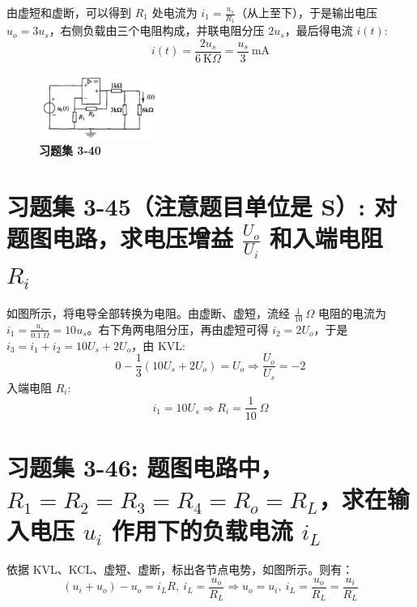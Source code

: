 \documentclass[UTF8]{report}
\def\mA{\ \mathrm{mA}}
\def\KO{\ \mathrm{K}\Omega}
\theoremstyle{MyLineTheoremStyle} %
\theoremstyle{MyBlockTheoremStyle} %
\theoremstyle{MySubsubsectionStyle} %
\begin{document}
由虚短和虚断，可以得到 $R_1$ 处电流为 $i_1 = \frac{u_s}{R_1}$（从上至下），于是输出电压 $u_o = 3u_s$，右侧负载由三个电阻构成，并联电阻分压 $2u_s$，最后得电流 $i(t)$:
\begin{equation}
i(t) = \frac{2u_s}{6 \KO} = \frac{u_s}{3} \mA
\end{equation}

\begin{figure}[H]\centering
\includegraphics[width=0.35\textwidth]{assets/3/3-40.jpg}
\caption{\bfseries 习题集 3-40}
\end{figure}

\section{习题集 3-45（注意题目单位是 S）: 对题图电路，求电压增益 $\frac{U_o}{U_i}$ 和入端电阻 $R_i$}

如图所示，将电导全部转换为电阻。由虚断、虚短，流经 $\frac{1}{10}\ \Omega$ 电阻的电流为 $i_1 = \frac{u_s}{0.1\ \Omega} = 10u_s$。右下角两电阻分压，再由虚短可得 $i_2 = 2U_o$，于是 $i_3 = i_1 + i_2 = 10 U_s + 2U_o$，由 KVL:
\begin{equation}
0 - \frac{1}{3}(10 U_s + 2U_o) = U_o \Longrightarrow  \frac{U_o}{U_s} = -2
\end{equation}
入端电阻 $R_i$: 
\begin{equation}
    i_1 = 10U_s \Longrightarrow  R_i = \frac{1}{10}\ \Omega
\end{equation}

\section{习题集 3-46: 题图电路中，$R_1 = R_2 = R_3 = R_4 = R_o = R_L$，求在输入电压 $u_i$ 作用下的负载电流 $i_L$}

依据 KVL、KCL、虚短、虚断，标出各节点电势，如图所示。则有：
\begin{equation}
(u_i+u_o)-u_o = i_LR,\ i_L = \frac{u_o}{R_L} \Longrightarrow u_o = u_i,\ i_L = \frac{u_o}{R_L} = \frac{u_i}{R_L}
\end{equation}
\end{document}
